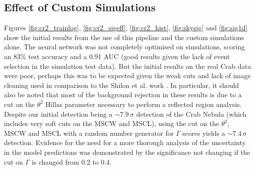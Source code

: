 \subsection{Effect of Custom Simulations}
Figures \ref{fig:cr2_trainlog}, \ref{fig:cr2_sigeff}, \ref{fig:cr2_hist}, \ref{fig:skysig} and \ref{fig:sig1d} show the initial results from the use of this pipeline and the custom simulations alone. The neural network was not completely optimised on simulations, scoring an 83\% test accuracy and a 0.91 AUC (good results given the lack of event selection in the simulation test data). But the initial results on the real Crab data were poor, perhaps this was to be expected given the weak cuts and lack of image cleaning used in comparison to the Shilon et al. work \cite{Shilon}. In particular, it should also be noted that most of the background rejection in these results is due to a cut on the $\theta^2$ Hillas parameter necessary to perform a reflected region analysis. Despite our initial detection being a $\mathrm{\sim 7.9\,\sigma}$ detection of the Crab Nebula (which includes very soft cuts on the MSCW and MSCL), using the cut on the $\theta^2$, MSCW and MSCL with a random number generator for $\Gamma$ scores yields a $\mathrm{\sim7.4\,\sigma}$ detection. Evidence for the need for a more thorough analysis of the  uncertainty in the model predictions was demonstrated by the significance not changing if the cut on $\Gamma$ is changed from 0.2 to 0.4.
\begin{table}[h]
    \centering
    \caption{Anasum output for custom simulations alone run.}
    \label{table:RNG}
\end{table}

